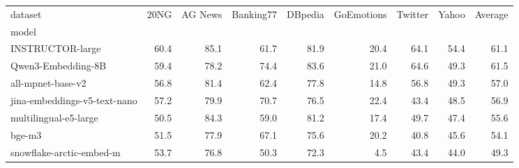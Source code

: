 \begin{tabular}{lrrrrrrrr}
\toprule
dataset & 20NG & AG News & Banking77 & DBpedia & GoEmotions & Twitter & Yahoo & Average \\
model &  &  &  &  &  &  &  &  \\
\midrule
INSTRUCTOR-large & 60.4 & 85.1 & 61.7 & 81.9 & 20.4 & 64.1 & 54.4 & 61.1 \\
Qwen3-Embedding-8B & 59.4 & 78.2 & 74.4 & 83.6 & 21.0 & 64.6 & 49.3 & 61.5 \\
all-mpnet-base-v2 & 56.8 & 81.4 & 62.4 & 77.8 & 14.8 & 56.8 & 49.3 & 57.0 \\
jina-embeddings-v5-text-nano & 57.2 & 79.9 & 70.7 & 76.5 & 22.4 & 43.4 & 48.5 & 56.9 \\
multilingual-e5-large & 50.5 & 84.3 & 59.0 & 81.2 & 17.4 & 49.7 & 47.4 & 55.6 \\
bge-m3 & 51.5 & 77.9 & 67.1 & 75.6 & 20.2 & 40.8 & 45.6 & 54.1 \\
snowflake-arctic-embed-m & 53.7 & 76.8 & 50.3 & 72.3 & 4.5 & 43.4 & 44.0 & 49.3 \\
\bottomrule
\end{tabular}
